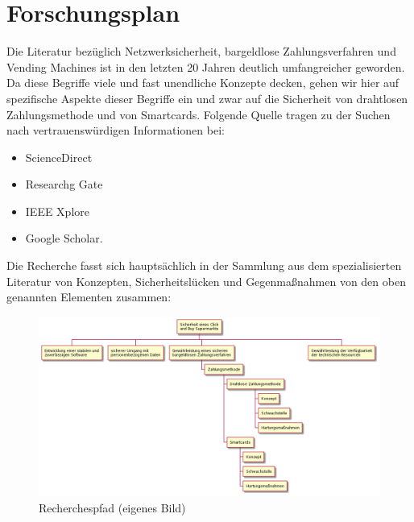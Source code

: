 \section{Forschungsplan}

Die Literatur bezüglich Netzwerksicherheit, bargeldlose Zahlungsverfahren und Vending Machines ist 
in den letzten 20 Jahren deutlich umfangreicher geworden. Da diese Begriffe viele und fast unendliche 
Konzepte decken, gehen wir hier auf spezifische Aspekte dieser Begriffe ein und zwar 
auf die Sicherheit von drahtlosen Zahlungsmethode und von Smartcards. Folgende Quelle tragen zu der
Suchen nach vertrauenswürdigen Informationen bei:

\begin{itemize}
    \item ScienceDirect
    \item Researchg Gate
    \item IEEE Xplore
    \item Google Scholar.
\end{itemize}

Die Recherche fasst sich hauptsächlich in der Sammlung aus dem spezialisierten Literatur von Konzepten,
Sicherheitslücken und Gegenmaßnahmen von den oben genannten Elementen zusammen:

\clearpage
\begin{landscape}
    \begin{figure}[htb]
        \includegraphics[width=25cm]{Bilder/Diagram2.png}
        \caption{Recherchespfad (eigenes Bild)}
        \label{fig:diagramrecherche}
    \end{figure}
\end{landscape}
\clearpage

\clearpage

